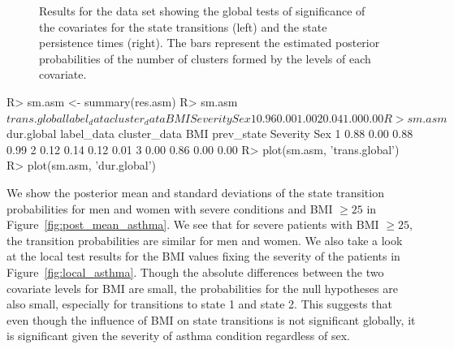 \begin{figure}[!ht]
\centering
{}
\qquad
{}
\caption{Results for the  data set showing the global tests of significance of the covariates for the state transitions (left) and the state persistence times (right).
The bars represent the estimated posterior probabilities of the number of clusters formed by the levels of each covariate.}
\label{fig:global_asthma}
\end{figure}



           
\begin{example}
R> sm.asm <- summary(res.asm)
R> sm.asm$trans.global
            label_data
cluster_data  BMI Severity  Sex
           1 0.96     0.00 1.00
           2 0.04     1.00 0.00
R> sm.asm$dur.global
                       label_data
cluster_data  BMI prev_state Severity  Sex
           1 0.88       0.00     0.88 0.99
           2 0.12       0.14     0.12 0.01
           3 0.00       0.86     0.00 0.00
R> plot(sm.asm, 'trans.global')
R> plot(sm.asm, 'dur.global')
\end{example}

We show the posterior mean and standard deviations of the state transition probabilities 
for men and women with severe conditions and BMI $\ge25$ in Figure~\ref{fig:post_mean_asthma}.
We see that for severe patients with BMI $\ge25$,  the transition probabilities are similar for men and women. 
We also take a look at the local test results for the BMI values fixing the severity of the patients in Figure~\ref{fig:local_asthma}. 
Though the absolute differences between the two covariate levels for BMI are small, the probabilities for the null hypotheses are also small, especially for transitions to state 1 and state 2.   
This suggests that even though the influence of BMI on state transitions is not significant globally,  
it is significant given the severity of asthma condition regardless of sex.


